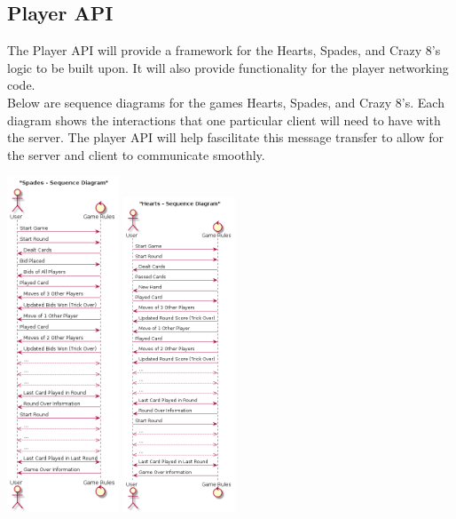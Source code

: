 \subsection*{Player API}
The Player API will provide a framework for the Hearts, Spades, and Crazy 8's logic to be built upon. It will also provide functionality for the player networking code. \\
\newline
Below are sequence diagrams for the games Hearts, Spades, and Crazy 8's. Each diagram shows the interactions that one particular client will need to have with the server. The player API will help fascilitate this message transfer to allow for the server and client to communicate smoothly.\\
\begin{center}
  \includegraphics[width=0.25\textwidth]{PlayerAPI/SequenceDiagrams/SpadesUML.png}
  \includegraphics[width=0.25\textwidth]{PlayerAPI/SequenceDiagrams/HeartsUML.png}

\end{center}
